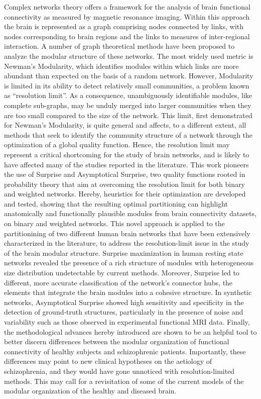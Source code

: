 Complex networks theory offers a framework for the analysis of brain functional connectivity as measured by magnetic resonance imaging.
Within this approach the brain is represented as a graph comprising nodes connected by links, with nodes corresponding to brain regions and the links to measures of inter-regional interaction.
A number of graph theoretical methods have been proposed to analyze the modular structure of these networks.
The most widely used metric is Newman's Modularity, which identifies modules within which links are more abundant than expected on the basis of a random network. However, Modularity is limited in its ability to detect relatively small communities, a problem known as ``resolution limit''.
As a consequence, unambiguously identifiable modules, like complete sub-graphs, may be unduly merged into larger communities when they are too small compared to the size of the network.
This limit, first demonstrated for Newman's Modularity, is quite general and affects, to a different extent, all methods that seek to identify the community structure of a network through the optimization of a global quality function.
Hence, the resolution limit may represent a critical shortcoming for the study of brain networks, and is likely to have affected many of the studies reported in the literature.
This work pioneers the use of Surprise and Asymptotical Surprise, two quality functions rooted in probability theory that aim at overcoming the resolution limit for both binary and weighted networks.
Hereby, heuristics for their optimization are developed and tested, showing that the resulting optimal partitioning can highlight anatomically and functionally plausible modules from brain connectivity datasets, on binary and weighted networks.
This novel approach is applied to the partitionining of two different human brain networks that have been extensively characterized in the literature, to address the resolution-limit issue in the study of the brain modular structure.
Surprise maximization in human resting state networks revealed the presence of a rich structure of modules with heterogeneous size distribution undetectable by current methods.
Moreover, Surprise led to different, more accurate classification of the network's connector hubs, the elements that integrate the brain modules into a cohesive structure.
In synthetic networks, Asymptotical Surprise showed high sensitivity and specificity in the detection of ground-truth structures, particularly in the presence of noise and variability such as those observed in experimental functional MRI data.
Finally, the methodological advances hereby introduced are shown to be an helpful tool to better discern differences between the modular organization of functional connectivity of healthy subjects and schizophrenic patients.
Importantly, these differences may point to new clinical hypotheses on the aetiology of schizophrenia, and they would have gone unnoticed with resolution-limited methods.
This may call for a revisitation of some of the current models of the modular organization of the healthy and diseased brain.
